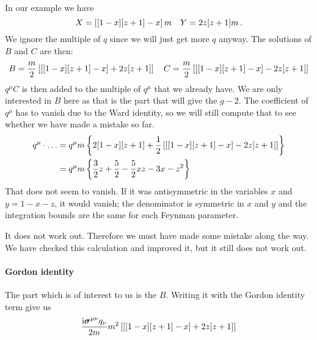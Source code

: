 \documentclass[11pt, english, fleqn, DIV=15, headinclude, BCOR=1cm]{scrartcl}
\begin{document}
In our example we have
\[
    X = \left[ [1 - x] [z + 1] - x \right] m
    \quad
    Y = 2 z [z+1] m \,.
\]
We ignore the multiple of $q$ since we will just get more $q$ anyway. The
solutions of $B$ and $C$ are then:
\[
    B = \frac m2 \left[ \left[ [1 - x] [z + 1] - x \right] + 2 z [z+1] \right]
    \quad
    C = \frac m2 \left[ \left[ [1 - x] [z + 1] - x \right] - 2 z [z+1] \right]
\]
$q^\mu C$ is then added to the multiple of $q^\mu$ that we already have. We are
only interested in $B$ here as that is the part that will give the $g-2$. The
coefficient of $q^\mu$ has to vanish due to the Ward identity, so we will still
compute that to see whether we have made a mistake so far.
\begin{align*}
    q^\mu \cdot \ldots
    &= q^\mu m \left\{ 
        2 [1 - x] [z + 1] + \frac 12 \left[ \left[ [1 - x] [z + 1] - x \right] - 2 z [z+1] \right]
     \right\} \\
    &= q^\mu m \left\{ 
    \frac 32 z + \frac 52 - \frac 52 xz - 3x - z^2
     \right\}
\end{align*}
That does not seem to vanish. If it was antisymmetric in the variables $x$ and
$y = 1 - x - z$, it would vanish; the denominator is symmetric in $x$ and $y$
and the integration bounds are the same for each Feynman parameter.

It does not work out. Therefore we must have made some mistake along the way.
We have checked this calculation and improved it, but it still does not work
out.

\paragraph{Gordon identity}

The part which is of interest to us is the $B$. Writing it with the Gordon
identity term give us
\[
    \frac{\iup \mat\sigma^{\mu\nu} q_\nu}{2m}
    m^2 \sbr{\sbr{[1 - x] [z + 1] - x} + 2 z [z+1]}
\]
\end{document}
